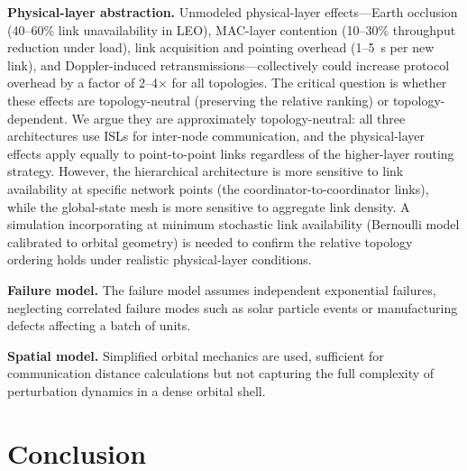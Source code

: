 \documentclass[journal]{IEEEtran}
\begin{document}
\textbf{Physical-layer abstraction.} Unmodeled physical-layer effects---Earth occlusion (40--60\% link unavailability in LEO), MAC-layer contention (10--30\% throughput reduction under load), link acquisition and pointing overhead (1--5~s per new link), and Doppler-induced retransmissions---collectively could increase protocol overhead by a factor of 2--4$\times$ for all topologies. The critical question is whether these effects are topology-neutral (preserving the relative ranking) or topology-dependent. We argue they are approximately topology-neutral: all three architectures use ISLs for inter-node communication, and the physical-layer effects apply equally to point-to-point links regardless of the higher-layer routing strategy. However, the hierarchical architecture is more sensitive to link availability at specific network points (the coordinator-to-coordinator links), while the global-state mesh is more sensitive to aggregate link density. A simulation incorporating at minimum stochastic link availability (Bernoulli model calibrated to orbital geometry) is needed to confirm the relative topology ordering holds under realistic physical-layer conditions.

\textbf{Failure model.} The failure model assumes independent exponential failures, neglecting correlated failure modes such as solar particle events or manufacturing defects affecting a batch of units.

\textbf{Spatial model.} Simplified orbital mechanics are used, sufficient for communication distance calculations but not capturing the full complexity of perturbation dynamics in a dense orbital shell.


\section{Conclusion}
\end{document}

